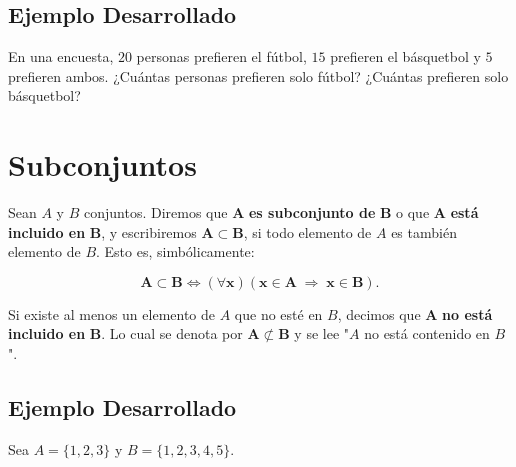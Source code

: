 \documentclass[12pt]{article}
\begin{document}
\subsection*{Ejemplo Desarrollado}

En una encuesta, $20$ personas prefieren el fútbol, $15$ prefieren el básquetbol y $5$ prefieren ambos. ¿Cuántas personas prefieren solo fútbol? ¿Cuántas prefieren solo básquetbol?
\vspace{4cm}

\section{Subconjuntos}
Sean $A$ y $B$ conjuntos. Diremos que $\mathbf{A}$\textbf{ es subconjunto de} $\mathbf{B}$ 
o que $\mathbf{A}$ \textbf{está incluido en} $\mathbf{B}$, y escribiremos $\mathbf{A \subset B}$, 
si todo elemento de $A$ es también elemento de $B$. Esto es, simbólicamente:

\[
\mathbf{A \subset B \Longleftrightarrow (\forall x)(x \in A \; \Rightarrow \;  x\in B).}
\]

\begin{center}

\end{center}

Si existe al menos un elemento de $A$ que no esté en $B$, decimos que $\mathbf{A}$ \textbf{no está incluido en} $\mathbf{B}$. Lo cual se denota por $\mathbf{A\not\subset B}$ y se lee "$A$ no está contenido en $B$".


\subsection*{Ejemplo Desarrollado} 

Sea \(A = \{1, 2, 3\}\) y \(B = \{1, 2, 3, 4, 5\}\).
\end{document}
